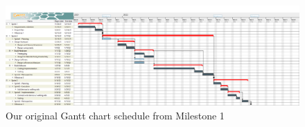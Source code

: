 \begin{figure}[H]
	\centering
	\captionsetup{width=1.0\linewidth}


	\includegraphics[width=1.0\linewidth]{graphics/ganttm1.png}

	\caption[Milestone 1 Gantt Chart]{Our original Gantt chart schedule from Milestone 1 \cite{coaker}}

	\label{fig:ganttm1}

\end{figure}
